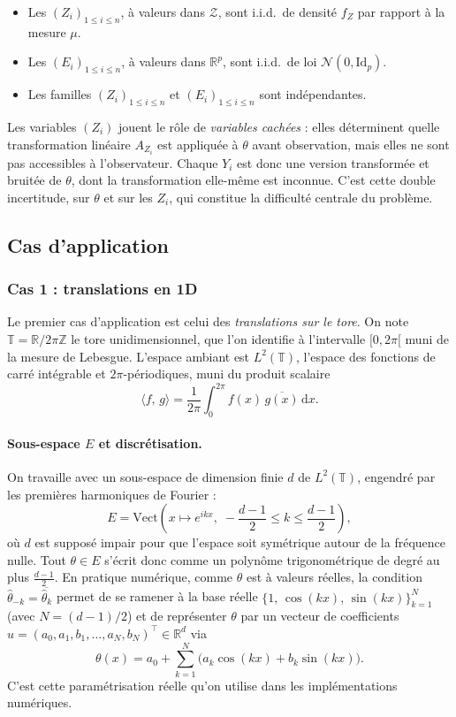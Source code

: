 \documentclass[12pt, a4paper]{article}
\theoremstyle{definition}
\newcommand{\R}{\mathbb{R}}
\newcommand{\Zcal}{\mathcal{Z}}
\newcommand{\Ncal}{\mathcal{N}}
\newcommand{\inner}[2]{\langle #1,\, #2 \rangle}
\begin{document}
\begin{itemize}
    \item Les $(Z_i)_{1 \leq i \leq n}$, à valeurs dans $\Zcal$, sont i.i.d.\
    de densité $f_Z$ par rapport à la mesure $\mu$.
    \item Les $(E_i)_{1 \leq i \leq n}$, à valeurs dans $\R^p$, sont i.i.d.\
    de loi $\Ncal(0, \mathrm{Id}_p)$.
    \item Les familles $(Z_i)_{1 \leq i \leq n}$ et $(E_i)_{1 \leq i \leq n}$
    sont indépendantes.
\end{itemize}

Les variables $(Z_i)$ jouent le rôle de \textit{variables cachées} : elles
déterminent quelle transformation linéaire $A_{Z_i}$ est appliquée à $\theta$
avant observation, mais elles ne sont pas accessibles à l'observateur.
Chaque $Y_i$ est donc une version transformée et bruitée de $\theta$, dont
la transformation elle-même est inconnue. C'est cette double incertitude,
sur $\theta$ et sur les $Z_i$,  qui constitue la difficulté centrale du problème.

\subsection{Cas d'application}
\label{subsec:cas_application}

\subsubsection{Cas 1 : translations en 1D}
\label{subsubsec:cas1}

Le premier cas d'application est celui des \textit{translations sur le tore}.
On note $\mathbb{T} = \mathbb{R} / 2\pi\mathbb{Z}$ le tore unidimensionnel,
que l'on identifie à l'intervalle $[0, 2\pi[$ muni de la mesure de Lebesgue.
L'espace ambiant est $L^2(\mathbb{T})$, l'espace des fonctions de carré intégrable
et $2\pi$-périodiques, muni du produit scalaire
\[
    \inner{f}{g} = \frac{1}{2\pi} \int_0^{2\pi} f(x)\,\overline{g(x)}\,\mathrm{d}x.
\]

\paragraph{Sous-espace $E$ et discrétisation.}
On travaille avec un sous-espace de dimension finie $d$ de $L^2(\mathbb{T})$,
engendré par les premières harmoniques de Fourier :
\[
    E = \mathrm{Vect}\!\left(x \mapsto e^{ikx},\;
    -\frac{d-1}{2} \leq k \leq \frac{d-1}{2}\right),
\]
où $d$ est supposé impair pour que l'espace soit symétrique autour de la fréquence
nulle. Tout $\theta \in E$ s'écrit donc comme un polynôme trigonométrique de degré
au plus $\frac{d-1}{2}$.
En pratique numérique, comme $\theta$ est à valeurs réelles, la condition
$\hat\theta_{-k} = \overline{\hat\theta_k}$ permet de se ramener à la base réelle
$\bigl\{1,\,\cos(kx),\,\sin(kx)\bigr\}_{k=1}^{N}$ (avec $N = (d-1)/2$) et de
représenter $\theta$ par un vecteur de coefficients
$u = (a_0, a_1, b_1, \ldots, a_N, b_N)^\top \in \R^d$ via
\[
    \theta(x) = a_0 + \sum_{k=1}^{N}\bigl(a_k\cos(kx) + b_k\sin(kx)\bigr).
\]
C'est cette paramétrisation réelle qu'on utilise dans les implémentations numériques.
\end{document}
